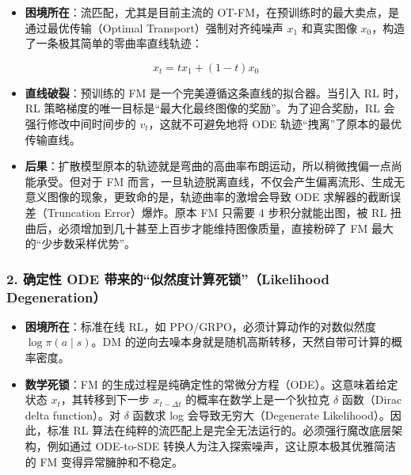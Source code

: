 \begin{itemize}
\tightlist
\item
{}
  \textbf{困境所在}：流匹配，尤其是目前主流的 OT-FM，在预训练时的最大卖点，是通过最优传输（Optimal Transport）强制对齐纯噪声 \(x_1\) 和真实图像 \(x_0\)，构造了一条极其简单的零曲率直线轨迹：
\end{itemize}

\[
x_t=t x_1+(1-t)x_0
\]

\begin{itemize}
\tightlist
\item
  \textbf{直线破裂}：预训练的 FM 是一个完美遵循这条直线的拟合器。当引入 RL 时，RL 策略梯度的唯一目标是``最大化最终图像的奖励''。为了迎合奖励，RL 会强行修改中间时间步的 \(v_t\)，这就不可避免地将 ODE 轨迹``拽离''了原本的最优传输直线。
\item
  \textbf{后果}：扩散模型原本的轨迹就是弯曲的高曲率布朗运动，所以稍微拽偏一点尚能承受。但对于 FM 而言，一旦轨迹脱离直线，不仅会产生偏离流形、生成无意义图像的现象，更致命的是，轨迹曲率的激增会导致 ODE 求解器的截断误差（Truncation Error）爆炸。原本 FM 只需要 4 步积分就能出图，被 RL 扭曲后，必须增加到几十甚至上百步才能维持图像质量，直接粉碎了 FM 最大的``少步数采样优势''。
\end{itemize}

\hypertarget{ux786eux5b9aux6027-ode-ux5e26ux6765ux7684ux4f3cux7136ux5ea6ux8ba1ux7b97ux6b7bux9501likelihood-degeneration}{%
\subsubsection{2. 确定性 ODE 带来的``似然度计算死锁''（Likelihood Degeneration）}\label{ux786eux5b9aux6027-ode-ux5e26ux6765ux7684ux4f3cux7136ux5ea6ux8ba1ux7b97ux6b7bux9501likelihood-degeneration}}

\begin{itemize}
\tightlist
\item
  \textbf{困境所在}：标准在线 RL，如 PPO/GRPO，必须计算动作的对数似然度 \(\log\pi(a\mid s)\)。DM 的逆向去噪本身就是随机高斯转移，天然自带可计算的概率密度。
\item
  \textbf{数学死锁}：FM 的生成过程是纯确定性的常微分方程（ODE）。这意味着给定状态 \(x_t\)，其转移到下一步 \(x_{t-\Delta t}\) 的概率在数学上是一个狄拉克 \(\delta\) 函数（Dirac delta function）。对 \(\delta\) 函数求 log 会导致无穷大（Degenerate Likelihood）。因此，标准 RL 算法在纯粹的流匹配上是完全无法运行的。必须强行魔改底层架构，例如通过 ODE-to-SDE 转换人为注入探索噪声，这让原本极其优雅简洁的 FM 变得异常臃肿和不稳定。
\end{itemize}

